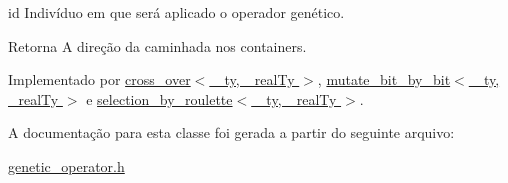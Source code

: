 id Indivíduo em que será aplicado o operador genético.

\begin{DoxyReturn}{Retorna}
A direção da caminhada nos containers. 
\end{DoxyReturn}


Implementado por \hyperlink{classcross__over_a1a840a73fa36cc7f4f7e769f78d73e81}{cross\_\-over$<$ \_\-ty, \_\-realTy $>$}, \hyperlink{classmutate__bit__by__bit_a2f8cc52a35943854f24b7534ecd90c7b}{mutate\_\-bit\_\-by\_\-bit$<$ \_\-ty, \_\-realTy $>$} e \hyperlink{classselection__by__roulette_a98be3d54afb87450f190615f7da330e9}{selection\_\-by\_\-roulette$<$ \_\-ty, \_\-realTy $>$}.



A documentação para esta classe foi gerada a partir do seguinte arquivo:\begin{DoxyCompactItemize}
\item 
\hyperlink{genetic__operator_8h}{genetic\_\-operator.h}\end{DoxyCompactItemize}
